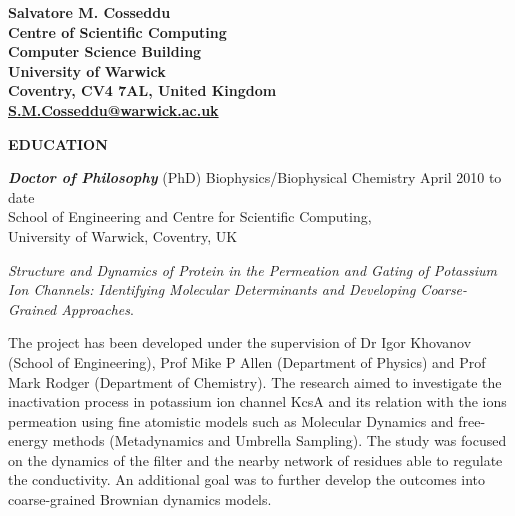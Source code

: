 \documentclass[a4paper,10pt,final]{memoir}
\newcommand{\Sep}{\vspace{1.5em}}
\newcommand{\SmallSep}{\vspace{0.5em}}
\newcommand{\CVSection}[1]
	{\Large\textbf{#1}\par
	\SmallSep\normalsize\normalfont}
\newcommand{\CVItem}[2]
	{\textit{\textbf{\color{RoyalBlue} #1}} #2}
\begin{document}
\Huge\bfseries {\color{RoyalBlue} Salvatore M. Cosseddu} \\
\small
Centre of Scientific Computing \\
Computer Science Building \\
University of Warwick \\
Coventry, CV4 7AL, United Kingdom \\
\url{S.M.Cosseddu@warwick.ac.uk}
\normalsize\normalfont
\SmallSep
\Sep

\CVSection{EDUCATION}
\CVItem{ Doctor of Philosophy}{(PhD) Biophysics/Biophysical Chemistry \hfill April 2010 to date} \\
School of Engineering and Centre for Scientific Computing, \\
University of Warwick, Coventry, UK %
\begin{description} [style=multiline,leftmargin=3cm,font=\normalfont] \itemsep -2pt
\item [Thesis:] \textit{Structure and Dynamics of Protein in the Permeation and Gating of
  Potassium Ion Channels: Identifying Molecular Determinants and Developing Coarse-Grained
  Approaches}.
\item [Research description:] The project has been developed under the supervision of Dr
  Igor Khovanov (School of Engineering), Prof Mike P Allen (Department of Physics) and
  Prof Mark Rodger (Department of Chemistry). The research aimed to investigate the
  inactivation process in potassium ion channel KcsA and its relation with the ions
  permeation using fine atomistic models such as Molecular Dynamics and free-energy
  methods (Metadynamics and Umbrella Sampling). The study was focused on the dynamics of
  the filter and the nearby network of residues able to regulate the conductivity. An
  additional goal was to further develop the outcomes into coarse-grained Brownian dynamics
  models. 
\end{description}
\SmallSep
\end{document}
